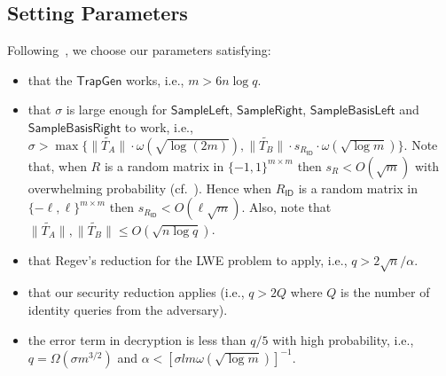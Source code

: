 \documentclass[runningheads,10pt]{llncs}
\def\bf{\mathbf}
\def\TrapGen{\mathsf{TrapGen}}
\def\SampleLeft{\mathsf{SampleLeft}}
\def\SampleRight{\mathsf{SampleRight}}
\def\SampleBasisLeft{\mathsf{SampleBasisLeft}}
\def\SampleBasisRight{\mathsf{SampleBasisRight}}
\def\e{\bf{e}}
\def\c{\bf{c}}
\def\ID{\mathsf{ID}}
\begin{document}
\subsection{Setting Parameters}\label{sec:params}
\iffalse 
As described in construction section, we have these equation during decryption.
$$\bf{w} = \c_1-\e^T\c_3 = \bf{m}\big\lfloor\frac{q}{2}\big\rfloor + \underbrace{\bf{x}_1 + \e^T\left[\bf{y}_1 | \bf{z}_1 | \bf{r}_1 \right]^T}_{\textsf{error term}}$$
$$\bf{w'} = \c_2-(\e')^T\c_4 = H(\bf{m})\big\lfloor\frac{q}{2}\big\rfloor + \underbrace{\bf{x}_2 + (\e')^T\left[\bf{y}_2 | \bf{z}_2 | \bf{r}_2 \right]^T}_{\textsf{error term}}$$
\fi	
Following~{\cite[Section 7.3]{ABB10-EuroCrypt}}, we choose our parameters satisfying:
\begin{itemize}
	\item that the $\TrapGen$ works, i.e., $m>6n\log q$.
	\item that $\sigma$ is large enough for $\SampleLeft$, $\SampleRight$, $\SampleBasisLeft$ and $\SampleBasisRight$ to work, i.e.,
	$\sigma>\max \{ \|\widetilde{T_A}\|\cdot \omega(\sqrt{\log (2m)}), \|\widetilde{T_B}\|\cdot s_{R_\ID}\cdot \omega(\sqrt{\log m})\}$. Note that, when $R$ is a random matrix in $\{-1,1\}^{m\times m}$ then $s_R<O(\sqrt{m})$ with overwhelming probability (cf.~{\cite[Lemma 15]{ABB10-EuroCrypt}}). Hence when $R_\ID$ is a random matrix in $\{-\ell,\ell\}^{m\times m}$ then $s_{R_\ID}<O(\ell\sqrt{m})$. Also, note that $\|\widetilde{T_A}\|, \|\widetilde{T_B}\| \leq O(\sqrt{n\log q})$.
	\item that Regev's reduction for the LWE problem to apply, i.e., $q>2\sqrt{n}/\alpha$.
	\item that our security reduction applies (i.e., $q>2Q$ where $Q$ is the number of identity queries from the adversary).
	
	\item the error term in decryption is less than ${q}/{5}$ with high probability, i.e., $q=\Omega(\sigma m^{3/2})$ and $\alpha<[\sigma lm\omega(\sqrt{\log m})]^{-1}$.
\end{itemize}

\iffalse
Hence the following choice of parameters $(q,m,\sigma,\alpha)$ from \cite{ABB10-EuroCrypt} satisfies all of the above conditions, taking $n$ to be the security parameter:
\begin{equation}\label{eq:params}
\begin{aligned}
& m=6n^{1+\delta}\quad,\quad q=\max(2Q,m^{2.5}\omega(\sqrt{\log n})) \\
& \sigma = m\ell\omega(\sqrt{\log n})\quad,\quad\alpha=[\ell^2m^2\omega(\sqrt{\log n})]^{-1}
\end{aligned}
\end{equation}
and round up $m$ to the nearest larger integer and $q$ to the nearest larger prime. Here we assume that $\delta$ is such that $n^\delta>\lceil\log q\rceil=O(\log n)$. In {\cite[Section 7.5]{ABB10-EuroCrypt}}, it is shown that one can remove the restriction $q>2Q$ and that $q=m^{2.5}\omega(\sqrt{\log n})$ is sufficient.
\fi	
\end{document}
